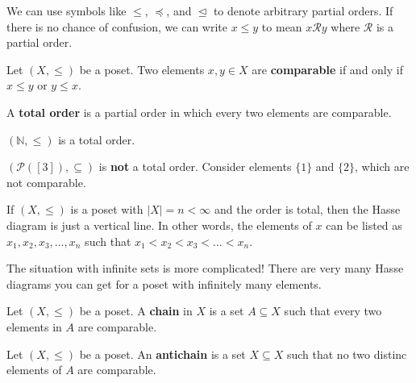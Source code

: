 \documentclass[a4paper]{article}
\begin{document}

\begin{notation}
	We can use symbols like \( \le  \), \( \preceq \), and \( \trianglelefteq \) to denote arbitrary partial orders. If there is no chance of confusion, we can write \( x\le y \) to mean \( x \mathcal{R} y \) where \( \mathcal{R} \) is a partial order.
\end{notation}

\begin{definition}
	Let \( (X, \le ) \) be a poset. Two elements \( x,y \in X \) are \textbf{comparable} if and only if \( x\le y \) or \( y\le x \).
\end{definition}

\begin{definition}
	A \textbf{total order} is a partial order in which every two elements are comparable.
\end{definition}

\begin{eg}
	\( (\mathbb{N},\le ) \) is a total order.
\end{eg}

\begin{eg}
	\( (\mathcal{P}([3]), \subseteq) \) is \textbf{not} a total order. Consider elements \( \{1\} \) and \( \{2\}   \), which are not comparable.
\end{eg}

\begin{note}
	If \( (X, \le ) \) is a poset with \( |X|=n < \infty \) and the order is total, then the Hasse diagram is just a vertical line. In other words, the elements of \( x \) can be listed as \( x_{1},x_{2},x_{3},\ldots ,x_n \) such that \( x_{1}<x_{2}<x_{3}<\ldots <x_n \).
\end{note}

The situation with infinite sets is more complicated! There are very many Hasse diagrams you can get for a poset with infinitely many elements.

\begin{definition}
	Let \( (X, \le ) \) be a poset. A \textbf{chain} in \( X \) is a set \( A \subseteq X \) such that every two elements in \( A \) are comparable.
\end{definition}

\begin{definition}
	Let \( (X, \le ) \) be a poset. An \textbf{antichain} is a set \( X \subseteq X \) such that no two distinc elements of \( A \) are comparable.
\end{definition}
\end{document}
